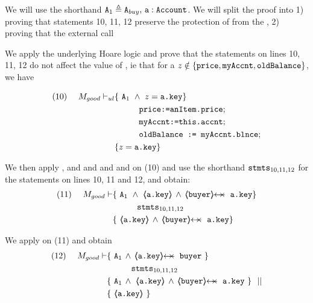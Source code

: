 \begin{proofO}
We will use the shorthand $\mbox{\normalfont{\texttt{A}}}_{1} \triangleq \mbox{\normalfont{\texttt{A}}}_{buy}, \,\mbox{\normalfont{\texttt{a}}}:\mbox{\normalfont{\texttt{Account}}}$.
We will split the proof into 1) proving that statements 10, 11, 12 preserve the protection of  from the , 2) proving that the external call 


We apply the underlying Hoare logic and prove that the statements on lines 10, 11, 12 do not affect the value of , ie that for a $z\notin \{ \mbox{\normalfont{\texttt{price}}}, \mbox{\normalfont{\texttt{myAccnt}}}, \mbox{\normalfont{\texttt{oldBalance}}} \}$, we have 

\begin{align*}
\text{(10)}  \ \ \ \ {M_{good} \vdash_{ul}} 
		&	\{  \ \mbox{\normalfont{\texttt{A}}}_{1}\  \wedge\ z=\mbox{\normalfont{\texttt{a.key}}} \} \\
		&   ~ \strut \hspace{.9cm} \mbox{\normalfont{\texttt{price:=anItem.price}}}; \\  
		&   ~ \strut \hspace{.9cm} \mbox{\normalfont{\texttt{myAccnt:=this.accnt}}}; \\  
                 &   ~ \strut \hspace{.9cm} \mbox{\normalfont{\texttt{oldBalance := myAccnt.blnce}}};\\
		& \{ z=\mbox{\normalfont{\texttt{a.key}}} \}
\end{align*}

We then apply {}, {} and {} and {} and and {} on (10) and use the shorthand $\mbox{\normalfont{\texttt{stmts}}}_{10,11,12}$ for the statements on lines 10, 11 and 12, and obtain: 
\\
\begin{align*}
\text{(11)}  \ \ \ \ M_{good} \vdash 
		&	\{  \ \Alocalsb\  \wedge\ {\inside{\prg{a.key}}} \, \wedge\, \protectedFrom{\prg{buyer}} {\prg{a.key}}  \} \\
		& \SPT \stmtsP\ \\  
		& \{ \ {\inside{\prg{a.key}}}  \, \wedge\, \protectedFrom{\prg{buyer}} {\prg{a.key}}   \}
\end{align*}



We apply  {}  on (11) and obtain 
\begin{align*}
\text{(12)}  \ \ \ \ M_{good} \vdash 
		&	\{  \ \Alocalsb\, \wedge\, \protectedFrom {\prg{a.key}} {\prg{buyer}}\  \} \\
		& \SPT \stmtsP\ \\  
		& \{ \ \Alocalsb\, \wedge \  {\inside{\prg{a.key}}} \, \wedge\, \protectedFrom{\prg{buyer}} {\prg{a.key}}  \ \} \ \ || \\
		& \{ \ {\inside{\prg{a.key}}}\  \}
\end{align*}


\end{proofO}
